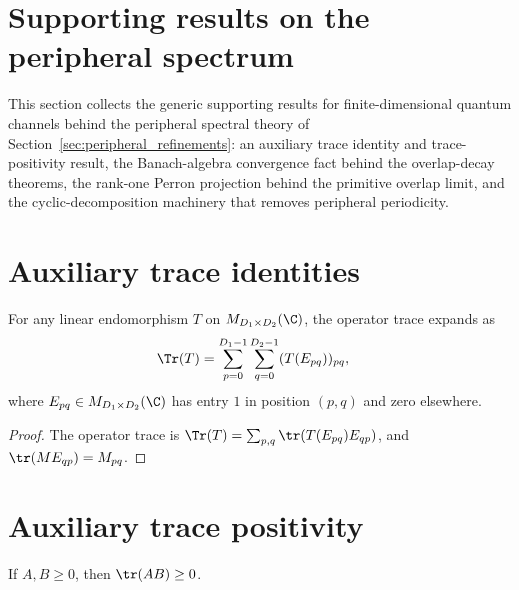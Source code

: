 \section{Supporting results on the peripheral spectrum}
\label{ch:spectral_supporting_results}

This section collects the generic supporting results for finite-dimensional
quantum channels behind the peripheral spectral theory of
Section~\ref{sec:peripheral_refinements}: an auxiliary trace identity and
trace-positivity result, the Banach-algebra convergence fact behind the
overlap-decay theorems, the rank-one Perron projection behind the primitive
overlap limit, and the cyclic-decomposition machinery that removes peripheral
periodicity.

\section{Auxiliary trace identities}
\label{sec:app_spectral_mixed_trace}


\begin{lemma}\label{lem:trace_expansion}
    \leanok
    For any linear endomorphism $T$ on $M_{D_1\times D_2}(\C)$, the operator
    trace expands as
    \begin{align}
        \Tr(T)
         & =\sum_{p=0}^{D_1-1}\sum_{q=0}^{D_2-1}
                              (T(E_{pq}))_{pq},
        \label{eq:spectral_trace_expansion}
    \end{align}
    where $E_{pq}\in M_{D_1\times D_2}(\C)$ has entry $1$ in position
    $(p,q)$ and zero elsewhere.
\end{lemma}

\begin{proof}\leanok
    The operator trace is
    $\Tr(T)=\sum_{p,q}\tr(T(E_{pq})E_{qp})$, and
    $\tr(ME_{qp})=M_{pq}$.
\end{proof}


\section{Auxiliary trace positivity}

\begin{lemma}
    \label{lem:psd_trace_product_nonneg}
    \leanok
    If $A,B\geq0$, then $\tr(AB)\geq0$.
\end{lemma}

